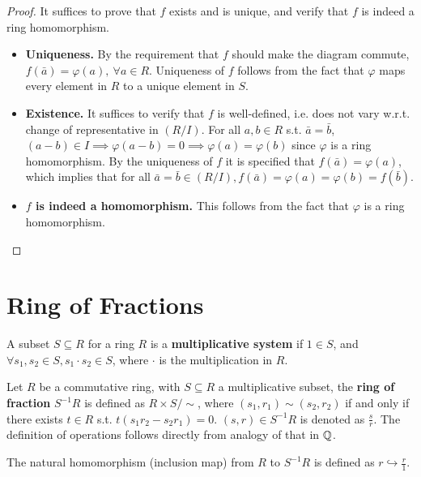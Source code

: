 \begin{proof}
    It suffices to prove that $f$ exists and is unique, and verify that $f$ is indeed a ring homomorphism.
    \begin{itemize}
        \item \textbf{Uniqueness.} By the requirement that $f$ should make the diagram commute, $f(\bar{a}) = \varphi(a),\ \forall a\in R$. Uniqueness of $f$ follows from the fact that $\varphi$ maps every element in $R$ to a unique element in $S$.
        \item \textbf{Existence.} It suffices to verify that $f$ is well-defined, i.e. does not vary w.r.t. change of representative in $(R/I)$. For all $a, b\in R$ s.t. $\bar{a} = \bar{b}$, $(a - b)\in I \implies \varphi(a - b) = 0 \implies \varphi(a) = \varphi(b)$ since $\varphi$ is a ring homomorphism. By the uniqueness of $f$ it is specified that $f(\bar{a}) = \varphi(a)$, which implies that for all $\bar{a} = \bar{b}\in (R/I), f(\bar{a}) = \varphi(a) = \varphi(b) = f(\bar{b})$.
        \item \textbf{$f$ is indeed a homomorphism.} This follows from the fact that $\varphi$ is a ring homomorphism.
    \end{itemize}
\end{proof}

\section{Ring of Fractions}

\begin{definition}
    A subset $S\subseteq R$ for a ring $R$ is a \textbf{multiplicative system} if $1\in S$, and $\forall s_1, s_2\in S, s_1\cdot s_2\in S$, where $\cdot$ is the multiplication in $R$.
\end{definition}

\begin{definition}
    Let $R$ be a commutative ring, with $S\subseteq R$ a multiplicative subset, the \textbf{ring of fraction} $S^{-1}R$ is defined as $R\times S / \sim$, where $(s_1, r_1) \sim (s_2, r_2)$ if and only if there exists $t\in R$ s.t. $t(s_1 r_2 - s_2 r_1) = 0$. $(s, r) \in S^{-1}R$ is denoted as $\frac{s}{r}$. The definition of operations follows directly from analogy of that in $\mathbb{Q}$.

    The natural homomorphism (inclusion map) from $R$ to $S^{-1}R$ is defined as $r \hookrightarrow \frac{r}{1}$.
\end{definition}

